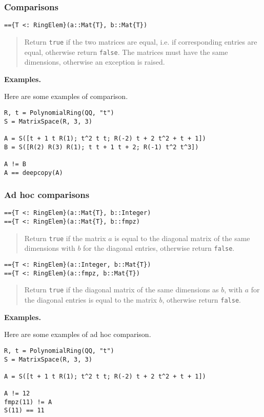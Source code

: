 \documentclass[a4paper,10pt]{article}
\newcommand{\code}{\lstinline}
\newcommand{\desc}[1]{\vspace{-3mm}\begin{quote}#1\end{quote}}
\begin{document}
\subsubsection{Comparisons}

\begin{lstlisting}
=={T <: RingElem}(a::Mat{T}, b::Mat{T})
\end{lstlisting}

\desc{Return \code{true} if the two matrices are equal, i.e. if corresponding
entries are equal, otherwise return \code{false}. The matrices must have the
same dimensions, otherwise an exception is raised.}

\textbf{Examples.}

Here are some examples of comparison.

\begin{lstlisting}
R, t = PolynomialRing(QQ, "t")
S = MatrixSpace(R, 3, 3)

A = S([t + 1 t R(1); t^2 t t; R(-2) t + 2 t^2 + t + 1])
B = S([R(2) R(3) R(1); t t + 1 t + 2; R(-1) t^2 t^3])

A != B
A == deepcopy(A)
\end{lstlisting}

\subsubsection{Ad hoc comparisons}

\begin{lstlisting}
=={T <: RingElem}(a::Mat{T}, b::Integer)
=={T <: RingElem}(a::Mat{T}, b::fmpz)
\end{lstlisting}

\desc{Return \code{true} if the matrix $a$ is equal to the diagonal matrix
of the same dimensions with $b$ for the diagonal entries, otherwise
return \code{false}.}

\begin{lstlisting}
=={T <: RingElem}(a::Integer, b::Mat{T})
=={T <: RingElem}(a::fmpz, b::Mat{T})
\end{lstlisting}

\desc{Return \code{true} if the diagonal matrix of the same dimensions as $b$,
with $a$ for the diagonal entries is equal to the matrix $b$, otherwise
return \code{false}.}

\textbf{Examples.}

Here are some examples of ad hoc comparison.

\begin{lstlisting}
R, t = PolynomialRing(QQ, "t")
S = MatrixSpace(R, 3, 3)

A = S([t + 1 t R(1); t^2 t t; R(-2) t + 2 t^2 + t + 1])

A != 12
fmpz(11) != A
S(11) == 11
\end{lstlisting}
\end{document}
